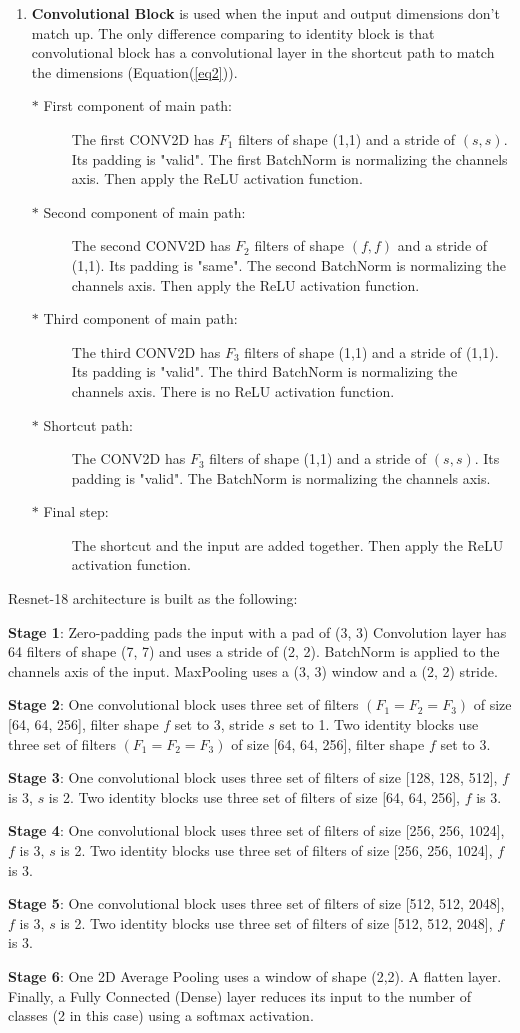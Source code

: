 \begin{enumerate}
\item  \textbf{Convolutional Block} is used when the input and output dimensions don't match up. The only difference comparing to identity block is that convolutional block has a convolutional layer in the shortcut path to match the dimensions (Equation(\ref{eq2})).
    \begin{description}
      \item[$\ast$ First component of main path:] The first CONV2D has $F_1$ filters of shape (1,1) and a stride of $(s,s)$. Its padding is "valid". The first BatchNorm is normalizing the channels axis. Then apply the ReLU activation function. 
      \item[$\ast$ Second component of main path:] The second CONV2D has $F_2$ filters of shape $(f,f)$ and a stride of (1,1). Its padding is "same". The second BatchNorm is normalizing the channels axis. Then apply the ReLU activation function. 
      \item[$\ast$ Third component of main path:] The third CONV2D has $F_3$ filters of shape (1,1) and a stride of (1,1). Its padding is "valid". The third BatchNorm is normalizing the channels axis. There is no ReLU activation function.
      \item[$\ast$ Shortcut path:] The CONV2D has $F_3$ filters of shape (1,1) and a stride of $(s,s)$. Its padding is "valid". The BatchNorm is normalizing the channels axis. 
      \item[$\ast$ Final step:] The shortcut and the input are added together. Then apply the ReLU activation function.
    \end{description}
\end{enumerate}

Resnet-18 architecture is built as the following:

\textbf{Stage 1}:
Zero-padding pads the input with a pad of (3, 3)
Convolution layer has 64 filters of shape (7, 7) and uses a stride of (2, 2).
BatchNorm is applied to the channels axis of the input.
MaxPooling uses a (3, 3) window and a (2, 2) stride.

\textbf{Stage 2}:
One convolutional block uses three set of filters $(F_1=F_2=F_3)$ of size [64, 64, 256], filter shape $f$ set to 3, stride $s$ set to 1.
Two identity blocks use three set of filters $(F_1=F_2=F_3)$ of size [64, 64, 256], filter shape $f$ set to 3.

\textbf{Stage 3}:
One convolutional block uses three set of filters of size [128, 128, 512], $f$ is 3, $s$ is 2.
Two identity blocks use three set of filters of size [64, 64, 256], $f$ is 3.

\textbf{Stage 4}:
One convolutional block uses three set of filters of size [256, 256, 1024], $f$ is 3, $s$ is 2.
Two identity blocks use three set of filters of size [256, 256, 1024], $f$ is 3.

\textbf{Stage 5}:
One convolutional block uses three set of filters of size  [512, 512, 2048], $f$ is 3, $s$ is 2.
Two identity blocks use three set of filters of size  [512, 512, 2048], $f$ is 3.

\textbf{Stage 6}:
One 2D Average Pooling uses a window of shape (2,2).
A flatten layer.
Finally, a Fully Connected (Dense) layer reduces its input to the number of classes (2 in this case) using a softmax activation.
